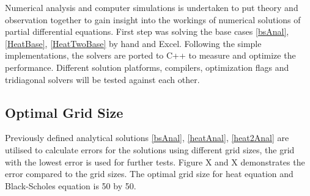 \documentclass[12pt, oneside]{book}
\theoremstyle{plain}
\theoremstyle{definition}
\begin{document}
Numerical analysis and computer simulations is undertaken to put theory and observation together to gain insight into the workings of numerical solutions of partial differential equations. First step was solving the base cases \ref{bsAnal}, \ref{HeatBase}, \ref{HeatTwoBase} by hand and Excel. Following the simple implementations, the solvers are ported to C++ to measure and optimize the performance.
Different solution platforms, compilers, optimization flags and tridiagonal solvers will be tested against each other.
 
\subsection{Optimal Grid Size}
Previously defined analytical solutions \ref{bsAnal}, \ref{heatAnal}, \ref{heat2Anal} are utilised to calculate errors for the solutions using different grid sizes, the grid with the lowest error is used for further tests. Figure X and X demonstrates the error compared to the grid sizes. The optimal grid size for heat equation and Black-Scholes equation is 50 by 50.
\end{document}
